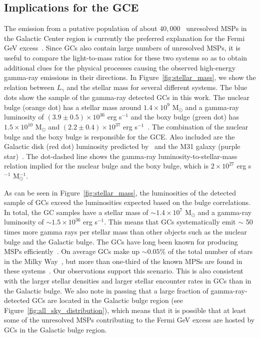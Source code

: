 \documentclass[doublespace,nopageskip]{VTthesis} %
\begin{document}
\subsection{Implications for the GCE}

The emission from a putative population of about $40,000$~\citep{2020JCAP...12..035P} unresolved MSPs in the Galactic Center region is currently the preferred explanation for the Fermi GeV excess~\citep{2018NatAs...2..387M,2018NatAs...2..819B,2019JCAP...09..042M,2020PhRvD.102d3012A}. Since GCs also contain large numbers of unresolved MSPs, it is useful to compare the light-to-mass ratios for these two systems so as to obtain additional clues for the physical processes causing the observed high-energy gamma-ray emissions in their directions. In Figure~\ref{fig:stellar_mass}, we show the relation between $L_\gamma$ and the stellar mass for several different systems. The blue dots show the sample of the gamma-ray detected GCs in this work. The nuclear bulge (orange dot) has a stellar mass around $1.4\times 10^9$ M$_\odot$ and a gamma-ray luminosity of $(3.9\pm 0.5)\times 10^{36}$ erg s$^{-1}$ and the boxy bulge (green dot) has $1.5\times 10^{10}$ M$_\odot$ and $(2.2 \pm 0.4)\times 10^{37}$ erg s$^{-1}$~\citep{2019JCAP...09..042M}. The combination of the nuclear bulge and the boxy bulge is responsible for the GCE. Also included are the Galactic disk (red dot) luminosity predicted by~\citet{2018NatAs...2..819B} and the M31 galaxy (purple star)~\citep{2017ApJ...836..208A}. The dot-dashed line shows the gamma-ray luminosity-to-stellar-mass relation implied for the nuclear bulge and the boxy bulge, which is $2 \times 10^{27}$ erg s$^{-1}$ M$_\odot^{-1}$. 

As can be seen in Figure~\ref{fig:stellar_mass}, the luminosities of the detected sample of GCs exceed the luminosities expected based on the bulge correlations. In total, the GC samples have a stellar mass of $\sim 1.4\times 10^7$ M$_\odot$ and a gamma-ray luminosity of $\sim 1.5\times 10^{36}$ erg s$^{-1}$. This means that GCs systematically emit $\sim$ 50 times more gamma rays per stellar mass than other objects such as the nuclear bulge and the Galactic bulge. The GCs have long been known for producing MSPs efficiently~\citep{2005ASPC..328..147C}. On average GCs make up $\sim 0.05\%$ of the total number of stars in the Milky Way~\citep{2019ApJ...877..122Y}, but more than one-third of the known MPSs are found in these systems~\citep{2005AJ....129.1993M}. Our observations support this scenario. This is also consistent with the larger stellar densities and larger stellar encounter rates in GCs than in the Galactic bulge. We also note in passing that a large fraction of gamma-ray-detected GCs are located in the Galactic bulge region (see Figure~\ref{fig:all_sky_distribution}), which means that it is possible that at least some of the unresolved MSPs contributing to the Fermi GeV excess are hosted by GCs in the Galactic bulge region.
\end{document}
